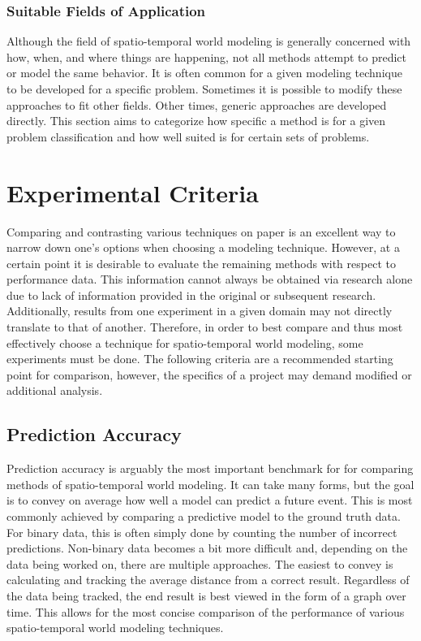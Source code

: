   \subsubsection{ Suitable Fields of Application }
  Although the field of spatio-temporal world modeling is generally concerned
  with how, when, and where things are happening, not all methods attempt to
  predict or model the same behavior. It is often common for a given modeling
  technique to be developed for a specific problem. Sometimes it is possible to
  modify these approaches to fit other fields. Other times, generic
  approaches are developed directly. This section aims to categorize how specific
  a method is for a given problem classification and how well suited is for certain
  sets of problems. \\


  \section{ Experimental Criteria }
  Comparing and contrasting various techniques on paper is an excellent way
  to narrow down one's options when choosing a modeling technique. However, at
  a certain point it is desirable to evaluate the remaining methods with
  respect to performance data. This information cannot always be obtained via
  research alone due to lack of information provided in the original or
  subsequent research. Additionally, results from one experiment in a given domain
  may not directly translate to that of another. Therefore, in order to best
  compare and thus most effectively choose a technique for spatio-temporal
  world modeling, some experiments must be done. The following criteria are
  a recommended starting point for comparison, however, the specifics of a
  project may demand modified or additional analysis. \\

  \subsection{ Prediction Accuracy }
  Prediction accuracy is arguably the most important benchmark for for comparing methods
  of spatio-temporal world modeling. It can take many forms, but the goal is
  to convey on average how well a model can predict a future event. This is
  most commonly achieved by comparing a predictive model to the ground truth
  data. For binary data, this is often simply done by counting the number of
  incorrect predictions. Non-binary data becomes a bit more difficult and, depending
  on the data being worked on, there are multiple approaches. The easiest
  to convey is calculating and tracking the average distance from a correct
  result. Regardless of the data being tracked, the end result is best viewed
  in the form of a graph over time. This allows for the most concise comparison
  of the performance of various spatio-temporal world modeling techniques. \\

